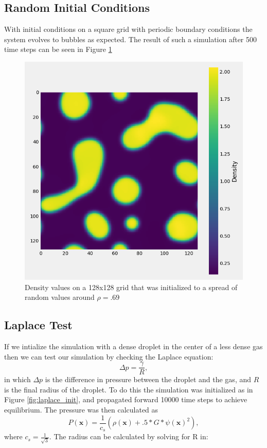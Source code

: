 \documentclass[]{article}
\begin{document}
\subsection{Random Initial Conditions}
With initial conditions on a square grid with periodic boundary conditions the system evolves to bubbles as expected. The result of such a simulation after 500 time steps can be seen in Figure \ref{fig:muphase_randinit}

\begin{figure}
	\centering
	\includegraphics[width=.6\textwidth]{figures/muphase_randinit.png}
	\caption{Density values on a 128x128 grid that was initialized to a spread of random values around $\rho=.69$}
	\label{fig:muphase_randinit}
\end{figure}

 
\subsection{Laplace Test}
If we intialize the simulation with a dense droplet in the center of a less dense gas then we can test our simulation by checking the Laplace equation:
\begin{equation}
\Delta p = \frac{\gamma}{R},
\end{equation}
in which $\Delta p$ is the difference in pressure between the droplet and the gas, and $R$ is the final radius of the droplet. To do this the simulation was initialized as in Figure \ref{fig:laplace_init}, and propagated forward 10000 time steps to achieve equilibrium. The pressure was then calculated as
\begin{equation}
P(\boldsymbol{x}) = \frac{1}{c_s}(\rho(\boldsymbol{x})+.5*G*\psi(\boldsymbol{x})^2),
\end{equation}
where $c_s = \frac{1}{\sqrt{3}}$. The radius can be calculated by solving for R in:
\end{document}
